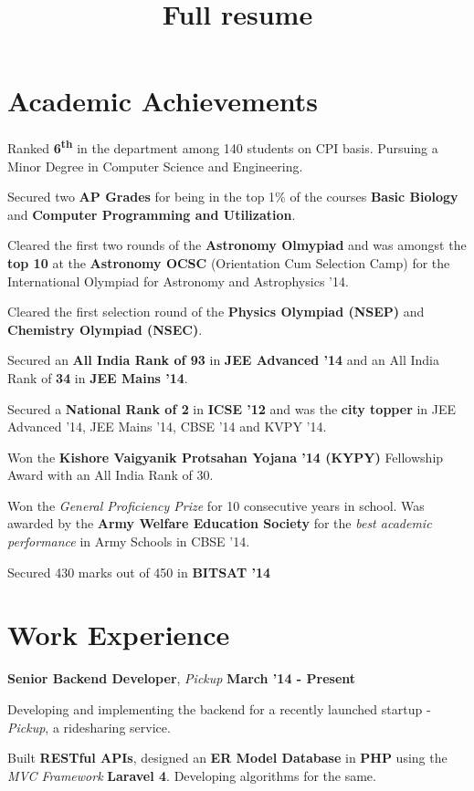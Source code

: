 \documentclass[11pt]{resume}
\title{Full resume}
\newcommand{\memph}[1]{#1}
\begin{document}
\topmargin=10mm
\vspace{-2em}
\begin{resume}
\section{\mysidestyle Academic Achievements}

\begin{list2}
\item Ranked \textbf {6\textsuperscript{th}} in the department among 140 students on CPI basis. \memph Pursuing a Minor Degree in Computer Science and Engineering.
\item Secured two \textbf {AP Grades} for being in the top 1\% of the courses \textbf{Basic Biology} and \textbf{Computer Programming and Utilization}.
\item Cleared the first two rounds of the \textbf{Astronomy Olmypiad} and was amongst the \textbf{top 10} at the \textbf {Astronomy OCSC} (Orientation Cum Selection Camp) for the International Olympiad for Astronomy and Astrophysics '14.
\item Cleared the first selection round of the \textbf{Physics Olympiad (NSEP)} and \textbf{Chemistry Olympiad (NSEC)}.
\item Secured an \textbf{All India Rank of 93} in \textbf{JEE Advanced '14}
and an All India Rank of \textbf{34} in \textbf{JEE Mains '14}.
\item Secured a \textbf{National Rank of 2} in \textbf{ICSE '12} and was the \textbf{city topper} in  JEE Advanced '14, JEE Mains '14, CBSE '14 and KVPY '14.
\item Won the \textbf {Kishore Vaigyanik Protsahan Yojana '14 (KYPY)} Fellowship Award with an All India Rank of 30.
\item Won the \textit{General Proficiency Prize} for 10 consecutive years in school. Was awarded by the \textbf {Army Welfare Education Society} for the \textit{best academic performance} in Army Schools in CBSE '14.
\item Secured 430 marks out of 450 in \textbf{BITSAT '14}
\end{list2}

\section{\mysidestyle Work Experience}
\textbf{Senior Backend Developer}, \textsl{Pickup} \hfill \textbf{March '14 - Present}

\begin{list2}
\item Developing and implementing the backend for a recently launched startup - \textit {Pickup}, a ridesharing service.
\item Built \textbf {RESTful APIs}, designed an \textbf {ER Model Database} in \textbf {PHP} using the \textit {MVC Framework} \textbf{Laravel 4}. Developing algorithms for the same.
\end{list2}


\end{resume}
\end{document}
